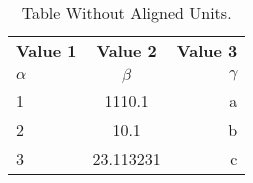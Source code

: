 \documentclass{article}
\begin{document}
	\begin{table}[h!]
		\begin{center}
			\caption{Table Without Aligned Units.}
			\label{tab:table1}
			\begin{tabular}{l|c|r}
				\textbf{Value 1} & \textbf{Value 2} & \textbf{Value 3}\\
				$\alpha$ & $\beta$ & $\gamma$\\
				\hline
				1 & 1110.1 & a\\
				2 & 10.1 & b\\
				3 & 23.113231 & c\\
			\end{tabular}
		\end{center}
	\end{table}
\end{document}
